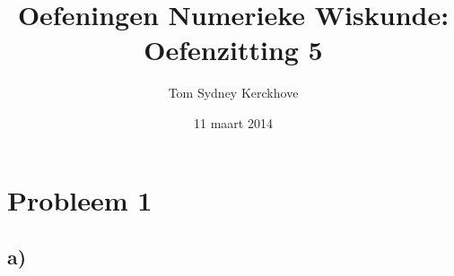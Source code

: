\documentclass[12pt,a4paper]{article}
\author{Tom Sydney Kerckhove}
\title{Oefeningen Numerieke Wiskunde:\\ Oefenzitting 5}
\date{11 maart 2014}
\begin{document}
\maketitle

\section{Probleem 1}
\subsection*{a)}
\end{document}
